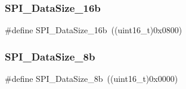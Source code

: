 \subsubsection{\texorpdfstring{SPI\_DataSize\_16b}{SPI\_DataSize\_16b}}
{\footnotesize\ttfamily \#define S\+P\+I\+\_\+\+Data\+Size\+\_\+16b~((uint16\+\_\+t)0x0800)}

\mbox{\label{group___s_p_i__data__size_ga56721814a935922b6ca7c49060509765}} 
\subsubsection{\texorpdfstring{SPI\_DataSize\_8b}{SPI\_DataSize\_8b}}
{\footnotesize\ttfamily \#define S\+P\+I\+\_\+\+Data\+Size\+\_\+8b~((uint16\+\_\+t)0x0000)}

